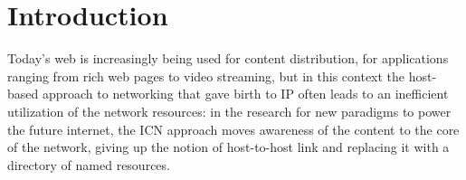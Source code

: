 \documentclass[11pt,a4paper,twoside,titlepage,openany]{book}
\begin{document}






\chapter{Introduction}
\label{chap:intro}

Today's web is increasingly being used for content distribution, for applications ranging from rich web pages   to video streaming, but in this context the host-based approach to networking that gave birth to IP often leads to an inefficient utilization of the network resources: in the research for new paradigms to power the future   internet, the \gls{ICN} approach moves awareness of the content to the core of the   network, giving up the notion of host-to-host link and replacing it with a directory of named resources.
\end{document}
